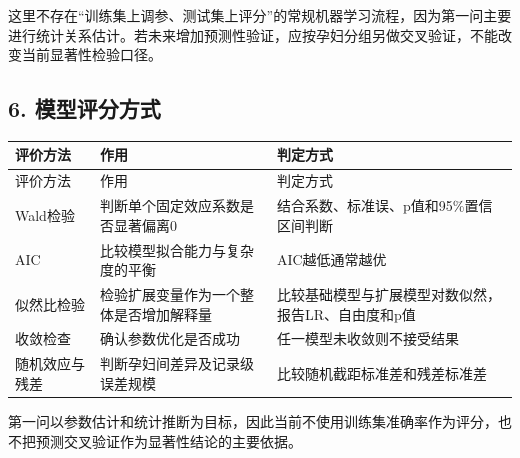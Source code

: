 \documentclass[UTF8,12pt,a4paper]{ctexart}
\begin{document}
这里不存在“训练集上调参、测试集上评分”的常规机器学习流程，因为第一问主要进行统计关系估计。若未来增加预测性验证，应按孕妇分组另做交叉验证，不能改变当前显著性检验口径。

\subsection{6. 模型评分方式}
\begingroup
\footnotesize
\setlength{\tabcolsep}{1.5pt}
\begin{longtable}{|>{\raggedright\arraybackslash}p{}|>{\raggedright\arraybackslash}p{}|>{\raggedright\arraybackslash}p{}|}
\hline
评价方法 & 作用 & 判定方式 \\ \hline
\endfirsthead
\hline
评价方法 & 作用 & 判定方式 \\ \hline
\endhead
Wald检验 & 判断单个固定效应系数是否显著偏离0 & 结合系数、标准误、p值和95\%置信区间判断 \\ \hline
AIC & 比较模型拟合能力与复杂度的平衡 & AIC越低通常越优 \\ \hline
似然比检验 & 检验扩展变量作为一个整体是否增加解释量 & 比较基础模型与扩展模型对数似然，报告LR、自由度和p值 \\ \hline
收敛检查 & 确认参数优化是否成功 & 任一模型未收敛则不接受结果 \\ \hline
随机效应与残差 & 判断孕妇间差异及记录级误差规模 & 比较随机截距标准差和残差标准差 \\ \hline
\end{longtable}
\endgroup

第一问以参数估计和统计推断为目标，因此当前不使用训练集准确率作为评分，也不把预测交叉验证作为显著性结论的主要依据。
\end{document}
